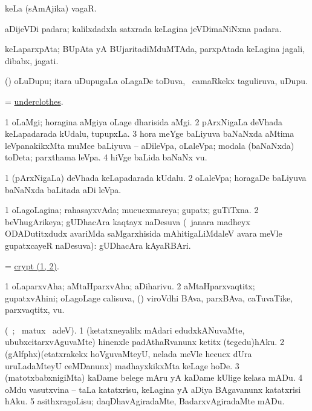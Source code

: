 \bentry
{} 
\gl{\nA}
\expl{}
\bmng
 keLa (sAmAjika) vagaR. 
\emng
\eentry

\bentry
{} 
\gl{\nA}
\expl{}
\bmng
 aDijeVDi padara; kalilxdadxla satxrada keLagina jeVDimaNiNxna padara. 
\emng
\eentry

\bentry
{} 
\gl{\nA}
\expl{}
\bmng
 keLaparxpAta; BUpAta yA BUjaritadiMduMTAda, parxpAtada keLagina jagali, dibabx, jagati. 
\emng
\eentry

\bentry
{} 
\gl{\nA}
\expl{}
\bmng
 (\bava) oLuDupu; itara uDupugaLa oLagaDe toDuva, \kanmu\ camaRkekx taguliruva, uDupu. 
\emng
\eentry

\bentry
{} 
\gl{\nA}
\expl{}
\bmng
= \hyperlink{underclothes}{underclothes}. 
\emng
\eentry

\bentry
{} 
\gl{\nA}
\expl{}
\bmng
\bnum
\num{1} oLaMgi; horagina aMgiya oLage dharisida aMgi. 
\num{2} pArxNigaLa deVhada keLapadarada kUdalu, tupupxLa. 
\num{3} hora meYge baLiyuva baNaNxda aMtima leVpanakikxMta muMce baLiyuva -- aDileVpa, oLaleVpa; modala (baNaNxda) toDeta; parxthama leVpa. 
\num{4} hiVge baLida baNaNx \mo vu. 
\enum
\emng
\eentry

\bentry
{} 
\gl{\nA}
\expl{}
\bmng
\bnum
\num{1} (pArxNigaLa) deVhada keLapadarada kUdalu. 
\num{2} oLaleVpa; horagaDe baLiyuva baNaNxda baLitada aDi leVpa. 
\enum
\emng
\eentry

\bentry
{} 
\gl{\gu}
\expl{}
\bmng
\bnum
\num{1} oLagoLagina; rahasayxvAda; mucucxmareya; gupatx; guTiTxna. 
\num{2} beVhugArikeya; gUDhacAra kaqtayx naDesuva (\kanmu\ janara madheyx ODADutitxdudx avariMda saMgarxhisida mAhitigaLiMdaleV avara meVle gupatxcayeR naDesuva):  gUDhacAra kAyaRBAri. 
\enum
\emng
\eentry

\bentry
{} 
\gl{\nA}
\expl{}
\bmng
 = \hyperref{kandict_c.pdf}{C}{crypt(1)}{crypt (1, 2)}. 
\emng
\eentry

\bentry
{} 
\gl{\nA}
\expl{}
\bmng
\bnum
\num{1} oLaparxvAha; aMtaHparxvAha; aDiharivu. 
\num{2} aMtaHparxvaqtitx; gupatxvAhini; oLagoLage calisuva, (\kanmu) viroVdhi BAva, parxBAva, caTuvaTike, parxvaqtitx, \mo vu. 
\enum
\emng
\eentry

\bentry
{} 
\gl{\sakirx}
\expl{}
\bmng
 (\vakaq\ ; \BU\ matux \BUkaq\ adeV). 
\bnum
\num{1} (ketatxneyalilx mAdari edudxkANuvaMte, ububxcitarxvAguvaMte) hinenxle padAthaRvanunx ketitx (tegedu)hAku. 
\num{2} (gAlfphx)(etatxrakekx hoVguvaMteyU, nelada meVle hecucx dUra uruLadaMteyU ceMDanunx) madhayxkikxMta keLage hoDe. 
\num{3} (matotxbabxnigiMta) kaDame belege mAru yA kaDame kUlige kelasa mADu. 
\num{4} oMdu vasutxvina -- taLa katatxrisu, keLagina yA aDiya BAgavanunx katatxrisi hAku. 
\num{5} asithxragoLisu; daqDhavAgiradaMte, BadarxvAgiradaMte mADu. 
\enum
\emng
\eentry


